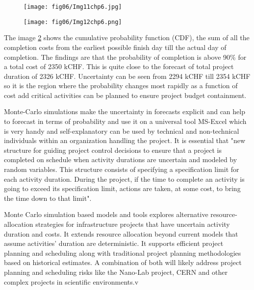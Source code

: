 \begin{figure}
	\centering
	\texttt{[image: fig06/Img11chp6.jpg]}
	\label{img11ch6}
\end{figure}
\begin{figure}
	\centering
	\texttt{[image: fig06/Img12chp6.png]}
	\label{img12ch6}
\end{figure}



The image \ref{img12ch6} shows the cumulative probability function (CDF), the sum of all the completion costs from the earliest possible finish day till the actual day of completion. The findings are that the probability of completion is above 90\% for a total cost of 2350 kCHF. This is quite close to the forecast of total project duration of 2326 kCHF. Uncertainty can be seen from 2294 kCHF till 2354 kCHF so it is the region where the probability changes most rapidly as a function of cost add critical activities can be planned to ensure project budget containment.

 
 Monte-Carlo simulations make the uncertainty in forecasts explicit and can help to forecast in terms of probability and use it on a universal tool MS-Excel which is very handy and self-explanatory can be used by technical and non-technical individuals within an organization handling the project. It is essential that "new structure for guiding project control decisions to ensure that a project is completed on schedule when activity durations are uncertain and modeled by random variables. This structure consists of specifying a specification limit for each activity duration. During the project, if the time to complete an activity is going to exceed its specification limit, actions are taken, at some cost, to bring the time down to that limit"\cite{BOWMAN20061191}.
 
 Monte Carlo simulation based models and tools explores alternative resource-allocation strategies for infrastructure projects that have uncertain activity duration and costs. It extends resource allocation beyond current models that assume activities' duration are deterministic. It supports efficient project planning and scheduling along with traditional project planning methodologies based on historical estimates. A combination of both will likely address project planning and scheduling risks like the Nano-Lab project, CERN and other complex projects in scientific environments.v
 
